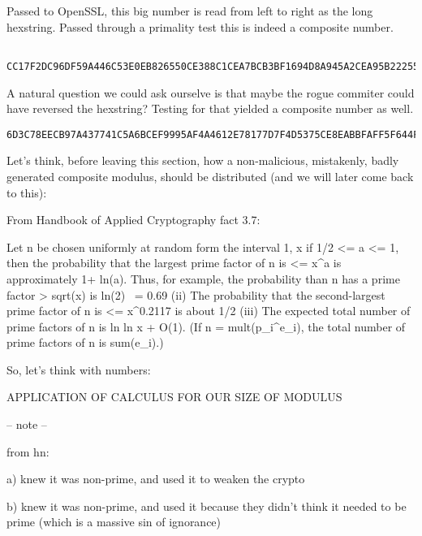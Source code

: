 \documentclass[a4paper,11pt]{article}
\begin{document}
Passed to OpenSSL, this big number is read from left to right as the long hexstring. Passed through a primality test this is indeed a composite number.

\begin{verbatim} CC17F2DC96DF59A446C53E0EB826550CE388C1CEA7BCB3BF1694D8A945A2CEA95B22255F9259941C22BFCBC8C857CBBFBC0EE840F98703BF609B08C68E99C605FC00D66D90A8F5F8D38D43C88F7ABDBB28AC04694A0B867337F06D4F04F6F5AFBFAB8ECE75534D7F7D17780E12464AAF9599EFBCA6C54177437AB9EC8E073C6D
\end{verbatim}

A natural question we could ask ourselve is that maybe the rogue commiter could have reversed the hexstring? Testing for that yielded a composite number as well.

\begin{verbatim}
6D3C78EECB97A437741C5A6BCEF9995AF4A4612E78177D7F4D5375CE8EABBFAFF5F644F6DF0377386B4A694AC28BBBD7A8FC8438DD3F8F5A8906DD60FC5C6998EC689B60BF387F940E8EBCBFCB57C8C8CBBF221C9459925F25225BA9CEA245A9D89416BFB3BCA7CEC188E3C5526B8E3EC546A459DF96DCF217CC
\end{verbatim}

Let's think, before leaving this section, how a non-malicious, mistakenly, badly generated composite modulus, should be distributed (and we will later come back to this):

From Handbook of Applied Cryptography fact 3.7:

    Let n be chosen uniformly at random form the interval 1, x if 1/2 <= a <= 1, then the probability that the largest prime factor of n is <= x^a is approximately 1+ ln(a). Thus, for example, the probability than n has a prime factor > sqrt(x) is ln(2) ~= 0.69 (ii) The probability that the second-largest prime factor of n is <= x^{0.2117} is about 1/2 (iii) The expected total number of prime factors of n is ln ln x + O(1). (If n = mult(p_i^{e_i}), the total number of prime factors of n is sum(e_i).)

So, let's think with numbers:

APPLICATION OF CALCULUS FOR OUR SIZE OF MODULUS


-- note --

from hn:


a) knew it was non-prime, and used it to weaken the crypto

b) knew it was non-prime, and used it because they didn't think it needed to be prime (which is a massive sin of ignorance)
\end{document}
